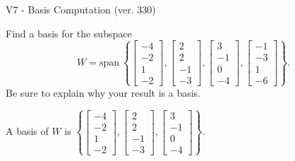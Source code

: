 \begin{exercise}
  \begin{exerciseTitle}V7 - Basis Computation (ver. 330)\end{exerciseTitle}
  \begin{exerciseStatement}
    Find a basis for the subspace 
\[W=\mathrm{span}\ \left\{\left[\begin{array}{r}
-4 \\
-2 \\
1 \\
-2
\end{array}\right] , \left[\begin{array}{r}
2 \\
2 \\
-1 \\
-3
\end{array}\right] , \left[\begin{array}{r}
3 \\
-1 \\
0 \\
-4
\end{array}\right] , \left[\begin{array}{r}
-1 \\
-3 \\
1 \\
-6
\end{array}\right]\right\}.\]
 Be sure to explain why your result is a basis.


  \end{exerciseStatement}
  \begin{exerciseAnswer}
   A basis of \(W\) is  \(\left\{\left[\begin{array}{r}
-4 \\
-2 \\
1 \\
-2
\end{array}\right] , \left[\begin{array}{r}
2 \\
2 \\
-1 \\
-3
\end{array}\right] , \left[\begin{array}{r}
3 \\
-1 \\
0 \\
-4
\end{array}\right]\right\}\).
  


  \end{exerciseAnswer}
\end{exercise}